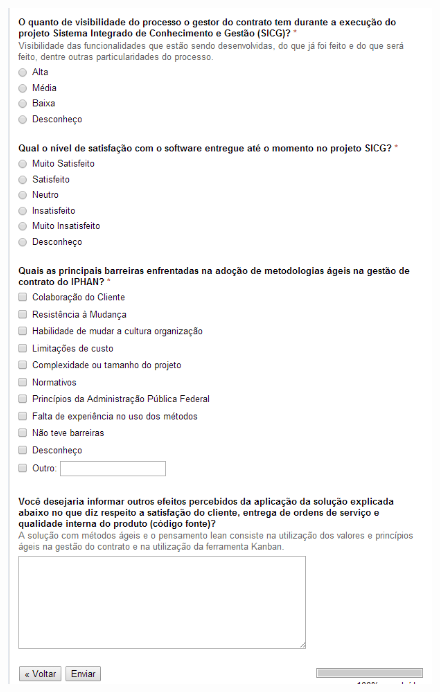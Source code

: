 \begin{apendicesenv}
\begin{figure}[H]
		\centering
			\includegraphics[scale=1.0]{figuras/quest7.png}

		\label{quest7}
\end{figure}


\end{apendicesenv}
